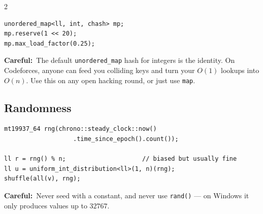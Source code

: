 \documentclass[10pt]{article}
\newcommand{\code}[1]{\texttt{\small #1}}
\newcommand{\warn}[1]{{\color{warnc}\footnotesize\textbf{Careful:}}~{\footnotesize #1}\par}
\begin{document}
\begin{multicols}{2}
\begin{lstlisting}
unordered_map<ll, int, chash> mp;
mp.reserve(1 << 20);
mp.max_load_factor(0.25);
\end{lstlisting}
\warn{The default \code{unordered\_map} hash for integers is the
identity. On Codeforces, anyone can feed you colliding keys and turn
your $O(1)$ lookups into $O(n)$. Use this on any open hacking round, or
just use \code{map}.}

\subsection{Randomness}
\begin{lstlisting}
mt19937_64 rng(chrono::steady_clock::now()
                   .time_since_epoch().count());

ll r = rng() % n;                     // biased but usually fine
ll u = uniform_int_distribution<ll>(1, n)(rng);
shuffle(all(v), rng);
\end{lstlisting}
\warn{Never seed with a constant, and never use \code{rand()} --- on
Windows it only produces values up to $32767$.}

\end{multicols}

\end{document}
